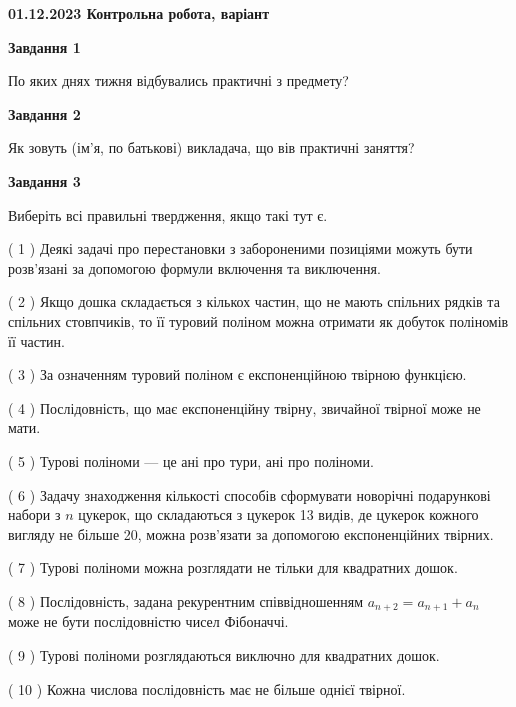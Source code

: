 \documentclass[12pt, ukrainian]{article}
\begin{document}
\begin {large}

\textbf{01.12.2023 Контрольна робота, варіант  }\par


{
{\begin {center}\textbf{Завдання 1}\end {center}}\par
По яких днях тижня відбувались практичні з предмету?\par
{\begin {center}\textbf{Завдання 2}\end {center}}\par
Як зовуть (ім'я, по батькові) викладача, що вів практичні заняття?\par
{\begin {center}\textbf{Завдання 3}\end {center}}\par
Виберіть всі правильні твердження, якщо такі тут є.\par
\vspace{2mm}
( 1 ) Деякі задачі про перестановки з забороненими позиціями можуть бути розв’я\-за\-ні за допомогою формули включення та виключення.%

( 2 ) Якщо дошка складається з кількох частин, що не мають спільних рядків та спільних стовпчиків, то її туровий поліном можна отримати як добуток поліномів її частин.%

( 3 ) За означенням туровий поліном є експоненційною твірною функцією.%

( 4 ) Послідовність, що має експоненційну твірну, звичайної твірної може не мати.%

( 5 ) Турові поліноми --- це ані про тури, ані про поліноми.%

( 6 ) Задачу знаходження кількості способів сформувати новорічні подарункові набори з $n$ цукерок, що складаються з цукерок 13 видів, де цукерок кожного вигляду не більше 20, можна розв’язати за допомогою експоненційних твірних.%

( 7 ) Турові поліноми можна розглядати не тільки для квадратних дошок.%

( 8 ) Послідовність, задана рекурентним співвідношенням $a_{n+2}=a_{n+1}+a_{n}$ може не бути послідовністю чисел Фібоначчі.%

( 9 ) Турові поліноми розглядаються виключно для квадратних дошок.%

( 10 ) Кожна числова послідовність має не більше однієї твірної.%
}
\end {large}

\vspace{4mm}
\newpage
\end{document}
